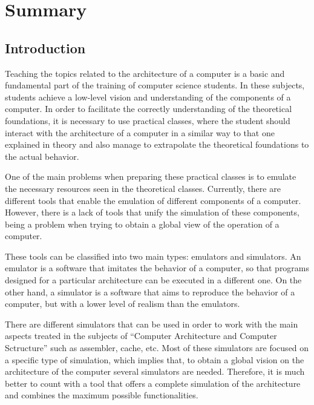 \chead[]{}
\renewcommand{\headrulewidth}{0.5pt}

\lfoot[]{}
\cfoot[]{}
\rfoot[]{}
\renewcommand{\footrulewidth}{0pt}

\appendix
\clearpage
\addappheadtotoc
\appendixpage
\chapter{Summary}
\label{ch:apendicea}

\section*{Introduction}

Teaching the topics related to the architecture of a computer is a basic and fundamental part of the training of computer science students. In these subjects, students achieve a low-level vision and understanding of the components of a computer. In order to facilitate the correctly understanding of the theoretical foundations, it is necessary to use practical classes, where the student should interact with the architecture of a computer in a similar way to that one explained in theory and also manage to extrapolate the theoretical foundations to the actual behavior.

One of the main problems when preparing these practical classes is to emulate the necessary resources seen in the theoretical classes. Currently, there are different tools that enable the emulation of different components of a computer. However, there is a lack of tools that unify the simulation of these components, being a problem when trying to obtain a global view of the operation of a computer.

These tools can be classified into two main types: emulators and simulators. An emulator is a software that imitates the behavior of a computer, so that programs designed for a particular architecture can be executed in a different one. On the other hand, a simulator is a software that aims to reproduce the behavior of a computer, but with a lower level of realism than the emulators.

There are different simulators that can be used in order to work with the main aspects treated in the subjects of ``Computer Architecture and Computer Sctructure'' such as assembler, cache, etc. Most of these simulators are focused on a specific type of simulation, which implies that, to obtain a global vision on the architecture of the computer several simulators are needed. Therefore, it is much better to count with a tool that offers a complete simulation of the architecture and combines the maximum possible functionalities.

